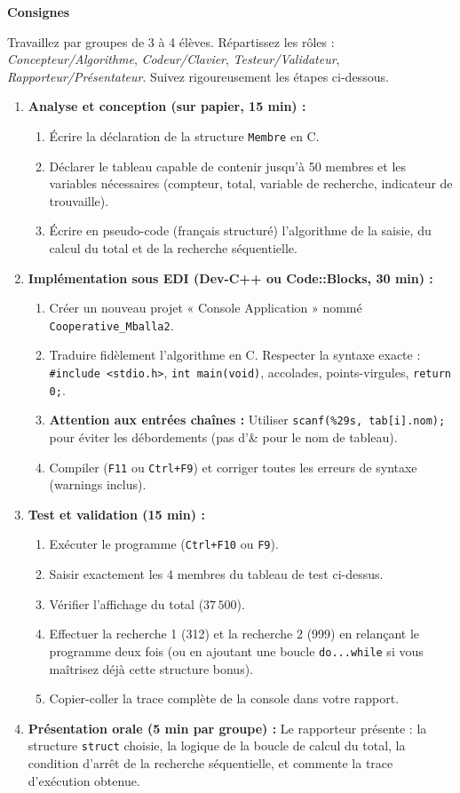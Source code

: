 \documentclass[11pt]{article}
\begin{document}
\textbf{Consignes}\par
Travaillez par groupes de 3 à 4 élèves. Répartissez les rôles : \emph{Concepteur/Algorithme}, \emph{Codeur/Clavier}, \emph{Testeur/Validateur}, \emph{Rapporteur/Présentateur}. Suivez rigoureusement les étapes ci-dessous.

\begin{enumerate}
    \item \textbf{Analyse et conception (sur papier, 15 min) :}
    \begin{enumerate}
        \item Écrire la déclaration de la structure \texttt{Membre} en C.
        \item Déclarer le tableau capable de contenir jusqu'à 50 membres et les variables nécessaires (compteur, total, variable de recherche, indicateur de trouvaille).
        \item Écrire en pseudo-code (français structuré) l'algorithme de la saisie, du calcul du total et de la recherche séquentielle.
    \end{enumerate}
    \item \textbf{Implémentation sous EDI (Dev-C++ ou Code::Blocks, 30 min) :}
    \begin{enumerate}
        \item Créer un nouveau projet « Console Application » nommé \texttt{Cooperative\_Mballa2}.
        \item Traduire fidèlement l'algorithme en C. Respecter la syntaxe exacte : \texttt{\#include <stdio.h>}, \texttt{int main(void)}, accolades, points-virgules, \texttt{return 0;}.
        \item \textbf{Attention aux entrées chaînes :} Utiliser \texttt{scanf(\%29s, tab[i].nom);} pour éviter les débordements (pas d'\& pour le nom de tableau).
        \item Compiler (\texttt{F11} ou \texttt{Ctrl+F9}) et corriger toutes les erreurs de syntaxe (warnings inclus).
    \end{enumerate}
    \item \textbf{Test et validation (15 min) :}
    \begin{enumerate}
        \item Exécuter le programme (\texttt{Ctrl+F10} ou \texttt{F9}).
        \item Saisir exactement les 4 membres du tableau de test ci-dessus.
        \item Vérifier l'affichage du total ($37\,500$).
        \item Effectuer la recherche 1 (312) et la recherche 2 (999) en relançant le programme deux fois (ou en ajoutant une boucle \texttt{do...while} si vous maîtrisez déjà cette structure bonus).
        \item Copier-coller la trace complète de la console dans votre rapport.
    \end{enumerate}
    \item \textbf{Présentation orale (5 min par groupe) :}
    Le rapporteur présente : la structure \texttt{struct} choisie, la logique de la boucle de calcul du total, la condition d'arrêt de la recherche séquentielle, et commente la trace d'exécution obtenue.
\end{enumerate}
\end{document}
